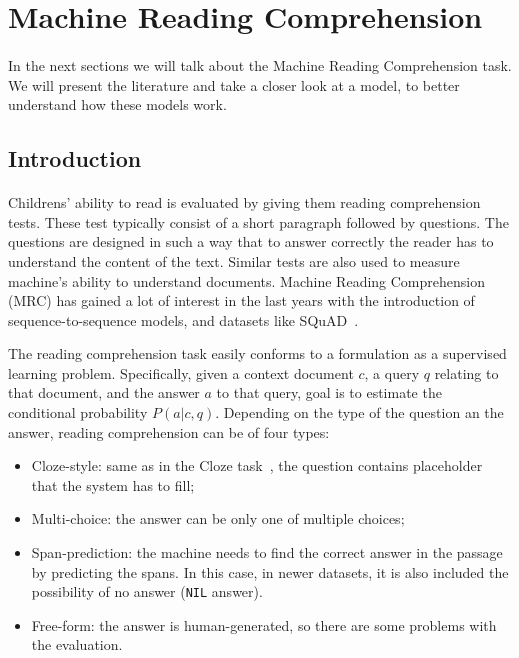 \section{Machine Reading Comprehension}
\label{sec:sota_mc}
\paragraph{}
In the next sections we will talk about the Machine Reading Comprehension task. We will present the literature and take a closer look at a model, to better understand how these models work.

\subsection{Introduction}
\paragraph{}
Childrens' ability to read is evaluated by giving them reading comprehension tests. These test typically consist of a short paragraph followed by questions. The questions are designed in such a way that to answer correctly the reader has to understand the content of the text. Similar tests are also used to measure machine's ability to understand documents. Machine Reading Comprehension (MRC) has gained a lot of interest in the last years with the introduction of sequence-to-sequence models, and datasets like SQuAD~\citep{rajpurkar2016squad, rajpurkar-etal-2018-know}. 

The reading comprehension task easily conforms to a formulation as a supervised learning problem. Specifically, given a context document $c$,  a query $q$ relating to that document, and the answer $a$ to that query,  goal is to estimate the conditional probability $P(a|c, q)$. Depending on the type of the question an the answer, reading comprehension can be of four types:

\begin{itemize}[- ,noitemsep]
    \item Cloze-style: same as in the Cloze task~\citep{taylor1953cloze}, the question contains placeholder that the system has to fill;
    \item Multi-choice: the answer can be only one of multiple choices;
    \item Span-prediction: the machine needs to find the correct answer in the passage by predicting the spans. In this case, in newer datasets, it is also included the possibility of no answer (\texttt{NIL} answer).
    \item Free-form: the answer is human-generated, so there are some problems with the evaluation.
\end{itemize}

